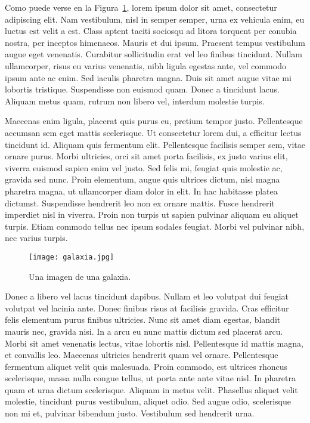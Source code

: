 Como puede verse en la Figura~\ref{fig:mesh1}, lorem ipsum dolor sit amet, consectetur adipiscing elit. Nam vestibulum, nisl in semper semper, urna ex vehicula enim, eu luctus est velit a est. Class aptent taciti sociosqu ad litora torquent per conubia nostra, per inceptos himenaeos. Mauris et dui ipsum. Praesent tempus vestibulum augue eget venenatis. Curabitur sollicitudin erat vel leo finibus tincidunt. Nullam ullamcorper, risus eu varius venenatis, nibh ligula egestas ante, vel commodo ipsum ante ac enim. Sed iaculis pharetra magna. Duis sit amet augue vitae mi lobortis tristique. Suspendisse non euismod quam. Donec a tincidunt lacus. Aliquam metus quam, rutrum non libero vel, interdum molestie turpis.

Maecenas enim ligula, placerat quis purus eu, pretium tempor justo. Pellentesque accumsan sem eget mattis scelerisque. Ut consectetur lorem dui, a efficitur lectus tincidunt id. Aliquam quis fermentum elit. Pellentesque facilisis semper sem, vitae ornare purus. Morbi ultricies, orci sit amet porta facilisis, ex justo varius elit, viverra euismod sapien enim vel justo. Sed felis mi, feugiat quis molestie ac, gravida sed nunc. Proin elementum, augue quis ultrices dictum, nisl magna pharetra magna, ut ullamcorper diam dolor in elit. In hac habitasse platea dictumst. Suspendisse hendrerit leo non ex ornare mattis. Fusce hendrerit imperdiet nisl in viverra. Proin non turpis ut sapien pulvinar aliquam eu aliquet turpis. Etiam commodo tellus nec ipsum sodales feugiat. Morbi vel pulvinar nibh, nec varius turpis.

\begin{figure}[t]
    \centering
    \texttt{[image: galaxia.jpg]}
    \caption{Una imagen de una galaxia.}
    \label{fig:mesh1}
\end{figure}

Donec a libero vel lacus tincidunt dapibus. Nullam et leo volutpat dui feugiat volutpat vel lacinia ante. Donec finibus risus at facilisis gravida. Cras efficitur felis elementum purus finibus ultricies. Nunc sit amet diam egestas, blandit mauris nec, gravida nisi. In a arcu eu nunc mattis dictum sed placerat arcu. Morbi sit amet venenatis lectus, vitae lobortis nisl. Pellentesque id mattis magna, et convallis leo. Maecenas ultricies hendrerit quam vel ornare. Pellentesque fermentum aliquet velit quis malesuada. Proin commodo, est ultrices rhoncus scelerisque, massa nulla congue tellus, ut porta ante ante vitae nisl. In pharetra quam et urna dictum scelerisque. Aliquam in metus velit. Phasellus aliquet velit molestie, tincidunt purus vestibulum, aliquet odio. Sed augue odio, scelerisque non mi et, pulvinar bibendum justo. Vestibulum sed hendrerit urna.

